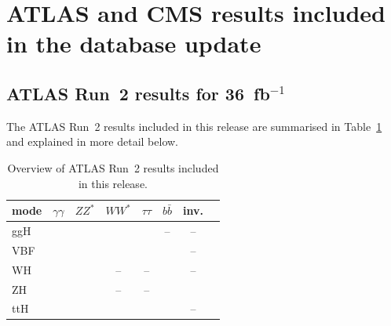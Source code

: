 \clearpage
\section{ATLAS and CMS results included in the database update}


\subsection{ATLAS Run~2 results for 36~fb$^{-1}$}

The ATLAS Run~2 results included in this release are summarised in Table~\ref{tab:ATLASresults} and explained in more detail below.

\begin{table}[h]\centering
\begin{tabular}{l | ccccccc}
mode & $\gamma\gamma$ & $ZZ^*$ & $WW^*$ & $\tau\tau$ & $b\bar b$ & inv. \\
\hline
ggH & \cite{Aaboud:2018xdt} & \cite{Aaboud:2017vzb} & \cite{Aaboud:2018jqu} & \cite{Aaboud:2018pen} & -- & --\\
VBF &  \cite{Aaboud:2018xdt} & \cite{Aaboud:2017vzb} & \cite{Aaboud:2018jqu} & \cite{Aaboud:2018pen} & \cite{Aaboud:2018gay} & -- \\
WH & \multirow{2}{*}{\!\!\cite{Aaboud:2018xdt}} & \multirow{2}{*}{\!\!\cite{Aaboud:2017vzb}} & -- & -- & \cite{Aaboud:2017xsd} & -- \\
ZH &  &  & -- & -- & \cite{Aaboud:2017xsd} & \cite{Aaboud:2017bja} \\
ttH & \cite{Aaboud:2018xdt,Aaboud:2017jvq} & \cite{Aaboud:2017vzb,Aaboud:2017jvq} & \cite{Aaboud:2017jvq} & \cite{Aaboud:2017jvq} & \cite{Aaboud:2017jvq,Aaboud:2017rss} & -- \\ 
\end{tabular}
\caption{Overview of ATLAS Run~2 results included in this release.} 
\label{tab:ATLASresults}
\end{table}


